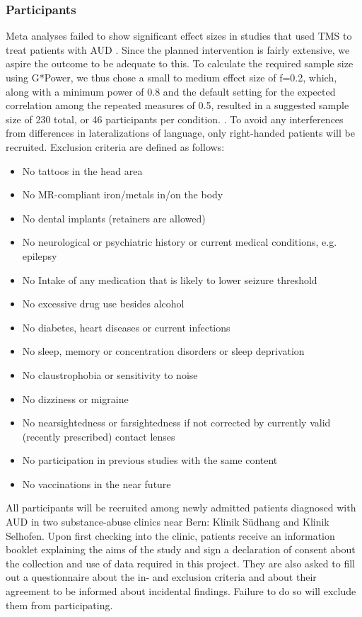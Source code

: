 \documentclass[12pt]{article}
\begin{document}
\subsubsection{Participants}

Meta analyses failed to show significant effect sizes in studies that used TMS to treat patients with AUD \parencite{mostafaviNoninvasiveBrainStimulation2020, zhangEffectsRepetitiveTranscranial2019}. Since the planned intervention is fairly extensive, we aspire the outcome to be adequate to this. To calculate the required sample size using G*Power, we thus chose a small to medium effect size of f=0.2, which, along with a minimum power of 0.8 and the default setting for the expected correlation among the repeated measures of 0.5, resulted in a suggested sample size of 230 total, or 46 participants per condition. \parencite{faulStatisticalPowerAnalyses2009, bhaleraoSampleSizeCalculation2010}. 
To avoid any interferences from differences in lateralizations of language, only right-handed patients will be recruited. Exclusion criteria are defined as follows:

\begin{itemize}
\item No tattoos in the head area 
\item No MR-compliant iron/metals in/on the body
\item No dental implants (retainers are allowed)
\item No neurological or psychiatric history or current medical conditions, e.g. epilepsy
\item No Intake of any medication that is likely to lower seizure threshold
\item No excessive drug use besides alcohol
\item No diabetes, heart diseases or current infections
\item No sleep, memory or concentration disorders or sleep deprivation
\item No claustrophobia or sensitivity to noise
\item No dizziness or migraine 
\item No nearsightedness or farsightedness if not corrected by currently valid (recently prescribed) contact lenses
\item No participation in previous studies with the same content  
\item No vaccinations in the near future 
\end{itemize}

All participants will be recruited among newly admitted patients diagnosed with AUD in two substance-abuse clinics near Bern: Klinik Südhang and Klinik Selhofen. Upon first checking into the clinic, patients receive an information booklet explaining the aims of the study and sign a declaration of consent about the collection and use of data required in this project. They are also asked to fill out a questionnaire about the in- and exclusion criteria and about their agreement to be informed about incidental findings. Failure to do so will exclude them from participating.
\end{document}
